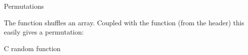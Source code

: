 \begin{comment}
  \Level 1 {Exercise}

  A \indextermbus{random}{walk} is a process
  where a position gets updated every time step.
  Every update is a displacement over a unit distance,
  in some random direction:
  \[ p_{i+1} = p_i + \overrightarrow r, \qquad \left|r\right|=1. \]

  This was originally invented as a way of modeling the spread of mosquitos:
  if a mosquito flies the same distance every day, but in a random direction,
  how far can it reach in its life span.

  \begin{exercise}
    Make \lstinline{Mosquito} class with a \lstinline{step} method.
    Calling this method updates the position of the mosquito
    by a random unit distance.
    Make the class so that the location can be in any number of dimensions.

    The main problem here is to compute the random displacement.
    \begin{itemize}
    \item You can use trigonometric functions to compute a point on the unit sphere.
    \item You also generate a point in a unit cube, and project it on the unit sphere.
    \end{itemize}
    In both cases, you have to be careful to let the points be uniform.
  \end{exercise}

  When you're convinced that your code is correct, explore the mathematics:

  \begin{exercise}
    Explore how far a mosquito can get from its starting point in $N$ days.
    Does this depend on the dimensionality~$d$?

    You may need to repeat every experiment a number of times
    to make it statistically significant.
  \end{exercise}
\end{comment}

 {Permutations}

The function  shuffles an array.
Coupled with the  function
(from the  header)
this easily gives a permutation:


 {C random function}
\label{sec:crand}

